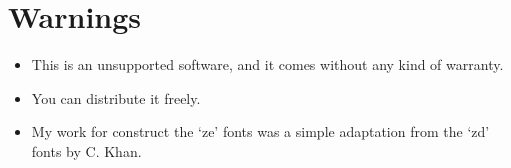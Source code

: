 \documentclass{article}
\begin{document}
\section{Warnings}
\begin{itemize}
\item
This is an unsupported software, and it comes without any kind of warranty.
\item
You can distribute it freely.
\item
My work for construct the `ze' fonts was a simple adaptation from the
`zd' fonts by C. Khan.
\end{itemize}
\end{document}
